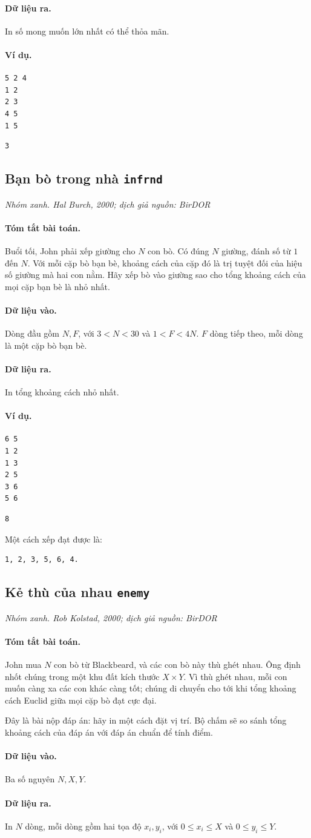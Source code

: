 \documentclass[11pt]{article}
\newcommand{\problem}[4]{%
  \subsection[#1 (#2)]{#1 \hfill {\normalsize\texttt{#2}}}%
  \noindent\textit{#3. #4}\par\smallskip
}
\newcommand{\iosec}[1]{\paragraph{#1}}
\begin{document}
\iosec{Dữ liệu ra.}
In số mong muốn lớn nhất có thể thỏa mãn.

\iosec{Ví dụ.}
\begin{verbatim}
5 2 4
1 2
2 3
4 5
1 5
\end{verbatim}

\begin{verbatim}
3
\end{verbatim}

\problem{Bạn bò trong nhà}{infrnd}{Nhóm xanh}{Hal Burch, 2000; dịch giả nguồn: BirDOR}

\iosec{Tóm tắt bài toán.}
Buổi tối, John phải xếp giường cho \(N\) con bò. Có đúng \(N\) giường, đánh số
từ \(1\) đến \(N\). Với mỗi cặp bò bạn bè, khoảng cách của cặp đó là trị tuyệt
đối của hiệu số giường mà hai con nằm. Hãy xếp bò vào giường sao cho tổng
khoảng cách của mọi cặp bạn bè là nhỏ nhất.

\iosec{Dữ liệu vào.}
Dòng đầu gồm \(N,F\), với \(3<N<30\) và \(1<F<4N\). \(F\) dòng tiếp theo, mỗi
dòng là một cặp bò bạn bè.

\iosec{Dữ liệu ra.}
In tổng khoảng cách nhỏ nhất.

\iosec{Ví dụ.}
\begin{verbatim}
6 5
1 2
1 3
2 5
3 6
5 6
\end{verbatim}

\begin{verbatim}
8
\end{verbatim}

Một cách xếp đạt được là:
\begin{verbatim}
1, 2, 3, 5, 6, 4.
\end{verbatim}

\problem{Kẻ thù của nhau}{enemy}{Nhóm xanh}{Rob Kolstad, 2000; dịch giả nguồn: BirDOR}

\iosec{Tóm tắt bài toán.}
John mua \(N\) con bò từ Blackbeard, và các con bò này thù ghét nhau. Ông định
nhốt chúng trong một khu đất kích thước \(X\times Y\). Vì thù ghét nhau, mỗi
con muốn càng xa các con khác càng tốt; chúng di chuyển cho tới khi tổng
khoảng cách Euclid giữa mọi cặp bò đạt cực đại.

Đây là bài nộp đáp án: hãy in một cách đặt vị trí. Bộ chấm sẽ so sánh tổng
khoảng cách của đáp án với đáp án chuẩn để tính điểm.

\iosec{Dữ liệu vào.}
Ba số nguyên \(N,X,Y\).

\iosec{Dữ liệu ra.}
In \(N\) dòng, mỗi dòng gồm hai tọa độ \(x_i,y_i\), với \(0\le x_i\le X\) và
\(0\le y_i\le Y\).
\end{document}
